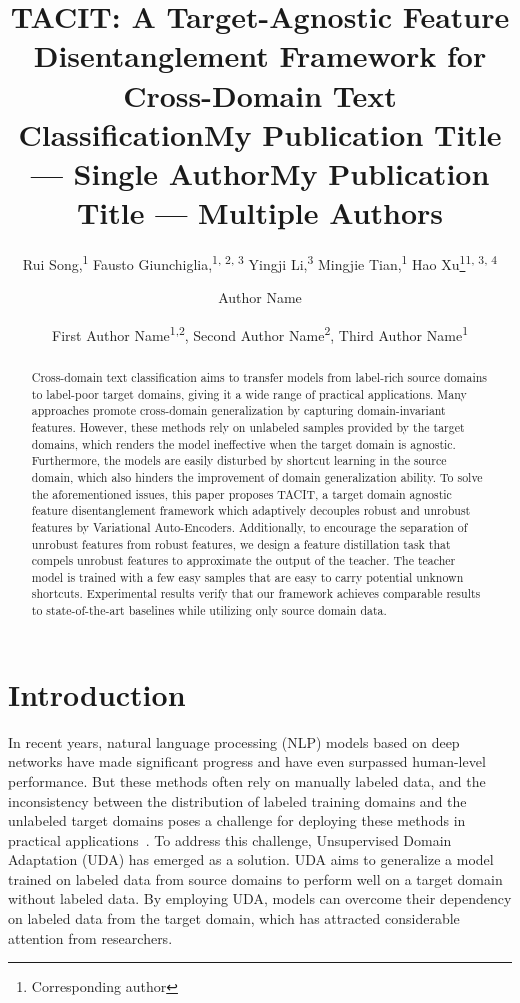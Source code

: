 \documentclass[letterpaper]{article} %
\title{TACIT: A Target-Agnostic Feature Disentanglement Framework for Cross-Domain Text Classification}
\author{
    Rui Song,\textsuperscript{\rm 1} 
    Fausto Giunchiglia,\textsuperscript{\rm 1, \rm 2, \rm 3}
    Yingji Li,\textsuperscript{\rm 3} 
    Mingjie Tian,\textsuperscript{\rm 1}
    Hao Xu\thanks{Corresponding author}\textsuperscript{\rm 1, \rm 3, \rm 4}
}
\title{My Publication Title --- Single Author}
\author {
    Author Name
}
\title{My Publication Title --- Multiple Authors}
\author {
    First Author Name\textsuperscript{\rm 1,\rm 2},
    Second Author Name\textsuperscript{\rm 2},
    Third Author Name\textsuperscript{\rm 1}
}
\begin{document}
\maketitle

\begin{abstract}
Cross-domain text classification aims to transfer models from label-rich source domains to label-poor target domains, giving it a wide range of practical applications. Many approaches promote cross-domain generalization by capturing domain-invariant features. However, these methods rely on unlabeled samples provided by the target domains, which renders the model ineffective when the target domain is agnostic. Furthermore, the models are easily disturbed by shortcut learning in the source domain, which also hinders the improvement of domain generalization ability. To solve the aforementioned issues, this paper proposes TACIT, a target domain agnostic feature disentanglement framework which adaptively decouples robust and unrobust features by Variational Auto-Encoders. Additionally, to encourage the separation of unrobust features from robust features, we design a feature distillation task that compels unrobust features to approximate the output of the teacher. The teacher model is trained with a few easy samples that are easy to carry potential unknown shortcuts. Experimental results verify that our framework achieves comparable results to state-of-the-art baselines while utilizing only source domain data.
\end{abstract}

\section{Introduction}
In recent years, natural language processing (NLP) models based on deep networks have made significant progress and have even surpassed human-level performance. But these methods often rely on manually labeled data, and the inconsistency between the distribution of labeled training domains and the unlabeled target domains poses a challenge for deploying these methods in practical applications~\cite{Ben-DavidRR20}. To address this challenge, Unsupervised Domain Adaptation (UDA) has emerged as a solution. UDA aims to generalize a model trained on labeled data from source domains to perform well on a target domain without labeled data. By employing UDA, models can overcome their dependency on labeled data from the target domain, which has attracted considerable attention from researchers. 
\end{document}
